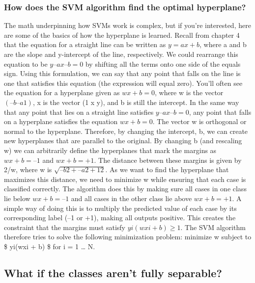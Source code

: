 \documentclass[
]{article}
\begin{document}
\subsubsection{How does the SVM algorithm find the optimal
hyperplane?}\label{how-does-the-svm-algorithm-find-the-optimal-hyperplane}

The math underpinning how SVMs work is complex, but if you're
interested, here are some of the basics of how the hyperplane is
learned. Recall from chapter 4 that the equation for a straight line can
be written as \(y = ax + b\), where a and b are the slope and
y-intercept of the line, respectively. We could rearrange this equation
to be \(y – ax – b = 0\) by shifting all the terms onto one side of the
equals sign. Using this formulation, we can say that any point that
falls on the line is one that satisfies this equation (the expression
will equal zero). You'll often see the equation for a hyperplane given
as \(wx + b = 0\), where w is the vector \((–b –a 1)\), x is the vector
(1 x y), and b is still the intercept. In the same way that any point
that lies on a straight line satisfies \(y – ax – b = 0\), any point
that falls on a hyperplane satisfies the equation \(wx + b = 0\). The
vector w is orthogonal or normal to the hyperplane. Therefore, by
changing the intercept, b, we can create new hyperplanes that are
parallel to the original. By changing b (and rescaling w) we can
arbitrarily define the hyperplanes that mark the margins as
\(wx + b = –1\) and \(wx + b = +1\). The distance between these margins
is given by 2/\textbar\textbar w\textbar\textbar, where
\textbar\textbar w\textbar\textbar{} is \(\sqrt {–b2 + –a2 + 12}\). As
we want to find the hyperplane that maximizes this distance, we need to
minimize \textbar\textbar w\textbar\textbar{} while ensuring that each
case is classified correctly. The algorithm does this by making sure all
cases in one class lie below \(wx + b = –1\) and all cases in the other
class lie above \(wx + b = +1\). A simple way of doing this is to
multiply the predicted value of each case by its corresponding label
(--1 or +1), making all outputs positive. This creates the constraint
that the margins must satisfy \(yi(wxi + b) \geq 1\). The SVM algorithm
therefore tries to solve the following minimization problem: minimize
\textbar\textbar w\textbar\textbar{} subject to \$ yi(wxi + b) \$
for i = 1 \ldots{} N.

\subsection{What if the classes aren't fully
separable?}\label{what-if-the-classes-arent-fully-separable}
\end{document}

